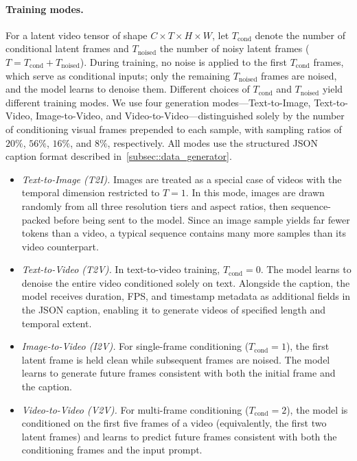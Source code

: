 

\paragraph{Training modes.}
For a latent video tensor of shape $C\times T\times H \times W$, let $T_{\textrm{cond}}$ denote the number of conditional latent frames and $T_{\textrm{noised}}$ the number of noisy latent frames ($T = T_{\textrm{cond}} + T_{\textrm{noised}}$). During training, no noise is applied to the first $T_{\textrm{cond}}$ frames, which serve as conditional inputs; only the remaining $T_{\textrm{noised}}$ frames are noised, and the model learns to denoise them. Different choices of $T_{\textrm{cond}}$ and $T_{\textrm{noised}}$ yield different training modes. We use four generation modes---Text-to-Image, Text-to-Video, Image-to-Video, and Video-to-Video---distinguished solely by the number of conditioning visual frames prepended to each sample, with sampling ratios of $20\%$, $56\%$, $16\%$, and $8\%$, respectively. All modes use the structured JSON caption format described in~\cref{subsec::data_generator}.


\begin{itemize}
\item \textit{Text-to-Image (T2I).} Images are treated as a special case of videos with the temporal dimension restricted to $T=1$. In this mode, images are drawn randomly from all three resolution tiers and aspect ratios, then sequence-packed before being sent to the model. Since an image sample yields far fewer tokens than a video, a typical sequence contains many more samples than its video counterpart.
\item \textit{Text-to-Video (T2V).} In text-to-video training, $T_{\textrm{cond}}=0$. The model learns to denoise the entire video conditioned solely on text. Alongside the caption, the model receives duration, FPS, and timestamp metadata as additional fields in the JSON caption, enabling it to generate videos of specified length and temporal extent.
\item \textit{Image-to-Video (I2V).} For single-frame conditioning ($T_{\textrm{cond}}=1$), the first latent frame is held clean while subsequent frames are noised. The model learns to generate future frames consistent with both the initial frame and the caption.
\item \textit{Video-to-Video (V2V).} For multi-frame conditioning ($T_{\textrm{cond}}=2$), the model is conditioned on the first five frames of a video (equivalently, the first two latent frames) and learns to predict future frames consistent with both the conditioning frames and the input prompt.
\end{itemize}

